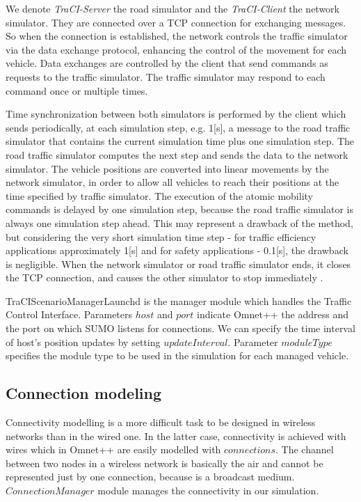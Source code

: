 We denote {\it TraCI-Server} the road simulator and the {\it TraCI-Client} the
network simulator. They are connected over a TCP connection for exchanging
messages. So when the connection is established, the network controls the
traffic simulator via the data exchange protocol, enhancing the control of the
movement for each vehicle. Data exchanges are controlled by the client that
send commands as requests to the traffic simulator. The traffic simulator
may respond to each command once or multiple times.

Time synchronization between both simulators is performed by the client which
sends periodically, at each simulation step, e.g. 1[s], a message to the road
traffic simulator that contains the current simulation time plus one simulation
step. The road traffic simulator computes the next step and sends the data to
the network simulator. The vehicle positions are converted into linear movements
by the network simulator, in order to allow all vehicles to reach their
positions at the time specified by traffic simulator. The execution of the
atomic mobility commands is delayed by one simulation step, because the road
traffic simulator is always one simulation step ahead. This may represent a
drawback of the method, but considering the very short simulation time step -
for traffic efficiency applications approximately 1[s] and for safety
applications - 0.1[s], the drawback is negligible. When the network simulator or
road traffic simulator ends, it closes the TCP connection, and causes the other
simulator to stop immediately \cite{traci_interface}.

TraCIScenarioManagerLaunchd is the manager module which handles the Traffic
Control Interface. Parameters $host$ and $port$ indicate Omnet++ the address and
the port on which SUMO listens for connections. We can specify the time interval
of host's position updates by setting $updateInterval$. Parameter $moduleType$
specifies the module type to be used in the simulation for each managed vehicle.

\subsection{Connection modeling}

Connectivity modelling is a more difficult task to be designed in wireless
networks than in the wired one. In the latter case, connectivity is achieved with wires
which in Omnet++ are easily modelled with $connections$. The channel between two
nodes in a wireless network is basically the air and cannot be represented just
by one connection, because is a broadcast medium. $ConnectionManager$ module
manages the connectivity in our simulation.

